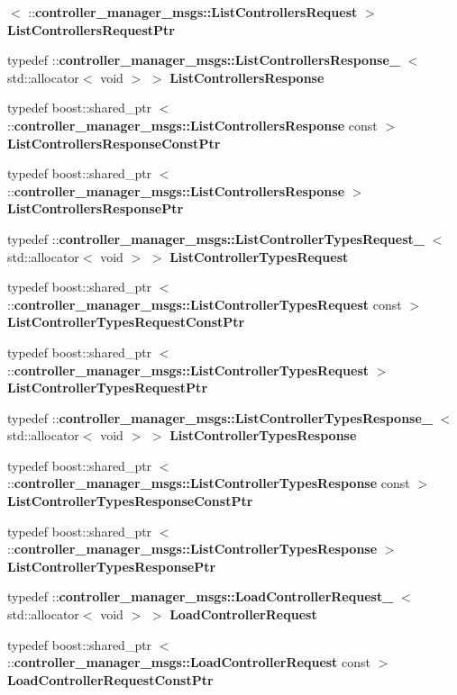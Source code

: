 \begin{DoxyCompactItemize}
$<$ \-::{\bf controller\-\_\-manager\-\_\-msgs\-::\-List\-Controllers\-Request} $>$ {\bf \-List\-Controllers\-Request\-Ptr}
\item 
typedef \*
\-::{\bf controller\-\_\-manager\-\_\-msgs\-::\-List\-Controllers\-Response\-\_\-}\*
$<$ std\-::allocator$<$ void $>$ $>$ {\bf \-List\-Controllers\-Response}
\item 
typedef boost\-::shared\-\_\-ptr\*
$<$ \-::{\bf controller\-\_\-manager\-\_\-msgs\-::\-List\-Controllers\-Response} \*
const  $>$ {\bf \-List\-Controllers\-Response\-Const\-Ptr}
\item 
typedef boost\-::shared\-\_\-ptr\*
$<$ \-::{\bf controller\-\_\-manager\-\_\-msgs\-::\-List\-Controllers\-Response} $>$ {\bf \-List\-Controllers\-Response\-Ptr}
\item 
typedef \*
\-::{\bf controller\-\_\-manager\-\_\-msgs\-::\-List\-Controller\-Types\-Request\-\_\-}\*
$<$ std\-::allocator$<$ void $>$ $>$ {\bf \-List\-Controller\-Types\-Request}
\item 
typedef boost\-::shared\-\_\-ptr\*
$<$ \-::{\bf controller\-\_\-manager\-\_\-msgs\-::\-List\-Controller\-Types\-Request} \*
const  $>$ {\bf \-List\-Controller\-Types\-Request\-Const\-Ptr}
\item 
typedef boost\-::shared\-\_\-ptr\*
$<$ \-::{\bf controller\-\_\-manager\-\_\-msgs\-::\-List\-Controller\-Types\-Request} $>$ {\bf \-List\-Controller\-Types\-Request\-Ptr}
\item 
typedef \*
\-::{\bf controller\-\_\-manager\-\_\-msgs\-::\-List\-Controller\-Types\-Response\-\_\-}\*
$<$ std\-::allocator$<$ void $>$ $>$ {\bf \-List\-Controller\-Types\-Response}
\item 
typedef boost\-::shared\-\_\-ptr\*
$<$ \-::{\bf controller\-\_\-manager\-\_\-msgs\-::\-List\-Controller\-Types\-Response} \*
const  $>$ {\bf \-List\-Controller\-Types\-Response\-Const\-Ptr}
\item 
typedef boost\-::shared\-\_\-ptr\*
$<$ \-::{\bf controller\-\_\-manager\-\_\-msgs\-::\-List\-Controller\-Types\-Response} $>$ {\bf \-List\-Controller\-Types\-Response\-Ptr}
\item 
typedef \*
\-::{\bf controller\-\_\-manager\-\_\-msgs\-::\-Load\-Controller\-Request\-\_\-}\*
$<$ std\-::allocator$<$ void $>$ $>$ {\bf \-Load\-Controller\-Request}
\item 
typedef boost\-::shared\-\_\-ptr\*
$<$ \-::{\bf controller\-\_\-manager\-\_\-msgs\-::\-Load\-Controller\-Request} \*
const  $>$ {\bf \-Load\-Controller\-Request\-Const\-Ptr}
\item 

\end{DoxyCompactItemize}

